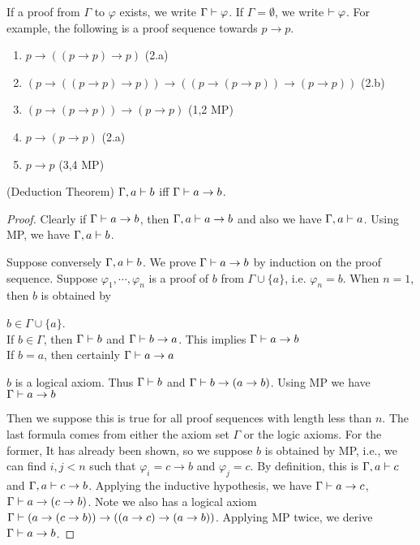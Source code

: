 If a proof from $\Gamma$ to $\varphi$ exists, we write $\Gamma\vdash\varphi$.
If $\Gamma=\emptyset$, we write $\vdash\varphi$. 
For example, the following is a proof sequence towards $p\to p$.
\begin{enumerate}
    \item $p\to((p\to p)\to p)$ (2.a)
    \item $(p\to((p\to p)\to p))\to((p\to(p\to p))\to(p\to p))$ (2.b)
    \item $(p\to(p\to p))\to(p\to p)$ (1,2 MP)
    \item $p\to(p\to p)$ (2.a)
    \item $p\to p$ (3,4 MP)
\end{enumerate}

\begin{theorem}
    \label{deduction-theorem} (Deduction Theorem)
    $\Gamma,a\vdash b$ iff $\Gamma\vdash a\to b$.
\end{theorem}
\begin{proof}
    Clearly if $\Gamma\vdash a\to b$, then $\Gamma,a\vdash a\to b$ and
    also we have $\Gamma,a\vdash a$. Using MP, we have $\Gamma,a\vdash b$.

    Suppose conversely $\Gamma,a\vdash b$. We prove $\Gamma\vdash a\to b$
    by induction on the proof sequence. Suppose $\varphi_1,\cdots,\varphi_n$
    is a proof of $b$ from $\Gamma\cup\{a\}$, i.e. $\varphi_n=b$.
    When $n=1$, then $b$ is obtained by
    \begin{case}
        $b\in\Gamma\cup\{a\}$. \\
        If $b\in\Gamma$, then $\Gamma\vdash b$ and 
        $\Gamma\vdash b\to a$. This implies $\Gamma\vdash a\to b$ \\
        If $b=a$, then certainly $\Gamma\vdash a\to a$
    \end{case}
    
    \begin{case}
        $b$ is a logical axiom. Thus $\Gamma\vdash b$ and 
        $\Gamma\vdash b\to(a\to b)$. Using MP we have $\Gamma\vdash a\to b$
    \end{case}

    Then we suppose this is true for all proof sequences with length
    less than $n$. The last formula comes from either the axiom set $\Gamma$
    or the logic axioms. For the former, It has already been shown, so we
    suppose $b$ is obtained by MP, i.e., we can find $i,j<n$ such that 
    $\varphi_i=c\to b$ and $\varphi_j=c$. By definition, this is 
    $\Gamma,a\vdash c$ and $\Gamma,a\vdash c\to b$. Applying the
    inductive hypothesis, we have $\Gamma\vdash a\to c$, 
    $\Gamma\vdash a\to(c\to b)$. Note we also has a logical axiom
    $\Gamma\vdash (a\to(c\to b))\to((a\to c)\to (a\to b))$.
    Applying MP twice, we derive $\Gamma\vdash a\to b$.
\end{proof}

